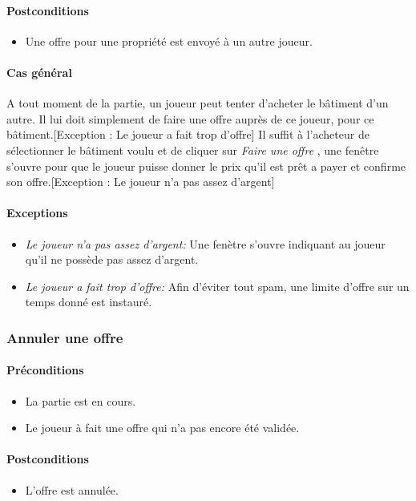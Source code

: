 \documentclass[a4paper,11pt]{report}
\begin{document}
\paragraph{Postconditions}
\begin{itemize}
 \item Une offre pour une propriété est envoyé à un autre joueur.
\end{itemize}
\paragraph{Cas général}
A tout moment de la partie, un joueur peut tenter d'acheter le bâtiment d'un autre. Il lui doit simplement de faire une offre auprès de ce joueur, pour ce bâtiment.[Exception : Le joueur a fait trop d'offre] Il suffit à l'acheteur de sélectionner le bâtiment voulu et de cliquer sur \og \textit{Faire une offre} \fg, une fenêtre s'ouvre pour que le joueur puisse donner le prix qu'il est prêt a payer et confirme son offre.[Exception : Le joueur n'a pas assez d'argent] 
\paragraph{Exceptions}
\begin{itemize}
 \item \textit{Le joueur n'a pas assez d'argent:} Une fenètre s'ouvre indiquant au joueur qu'il ne possède pas assez d'argent.
 \item \textit{Le joueur a fait trop d'offre:} Afin d'éviter tout spam, une limite d'offre sur un temps donné est instauré.
\end{itemize}
\subsubsection{Annuler une offre}
\paragraph{Préconditions}
\begin{itemize}
 \item La partie est en cours.
 \item Le joueur à fait une offre qui n'a pas encore été validée.
\end{itemize}
\paragraph{Postconditions}
\begin{itemize}
 \item L'offre est annulée.
\end{itemize}
\end{document}
